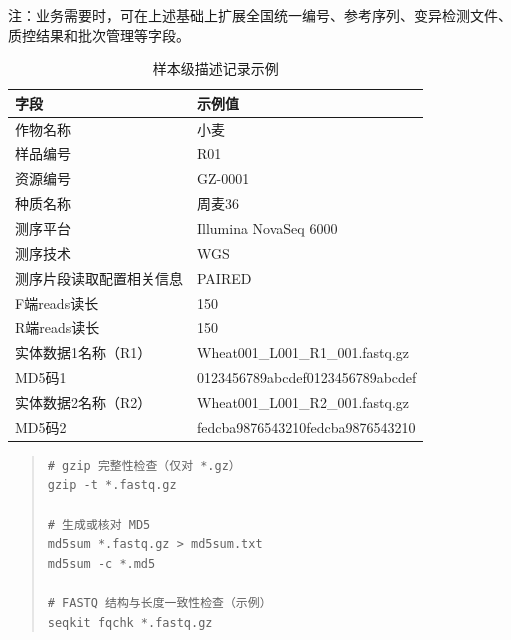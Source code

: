 注：业务需要时，可在上述基础上扩展全国统一编号、参考序列、变异检测文件、质控结果和批次管理等字段。

\begin{table}[htbp]
\centering
{}
\caption{样本级描述记录示例}
\begin{tabular}{p{5cm}p{8.5cm}}
\hline
字段 & 示例值 \\
\hline
作物名称 & 小麦 \\
样品编号 & R01 \\
资源编号 & GZ-0001 \\
种质名称 & 周麦36 \\
测序平台 & Illumina NovaSeq 6000 \\
测序技术 & WGS \\
测序片段读取配置相关信息 & PAIRED \\
F端reads读长 & 150 \\
R端reads读长 & 150 \\
实体数据1名称（R1） & Wheat001\_L001\_R1\_001.fastq.gz \\
MD5码1 & 0123456789abcdef0123456789abcdef \\
实体数据2名称（R2） & Wheat001\_L001\_R2\_001.fastq.gz \\
MD5码2 & fedcba9876543210fedcba9876543210 \\
\hline
\end{tabular}
\end{table}

\begin{quote}
\begin{verbatim}
# gzip 完整性检查（仅对 *.gz）
gzip -t *.fastq.gz

# 生成或核对 MD5
md5sum *.fastq.gz > md5sum.txt
md5sum -c *.md5

# FASTQ 结构与长度一致性检查（示例）
seqkit fqchk *.fastq.gz
\end{verbatim}
\end{quote}

